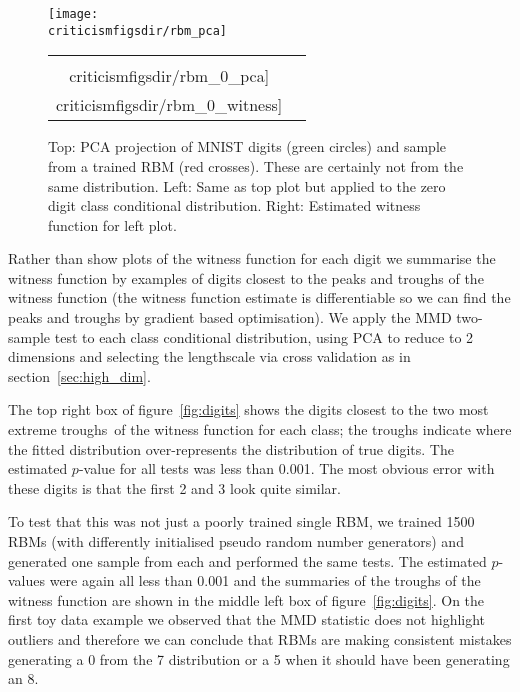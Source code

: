 \begin{figure}[ht]
  \begin{center}
  \texttt{[image: \\criticismfigsdir/rbm\_pca]}
  \end{center}
  \begin{center}
  \begin{tabular}{cc}
    \texttt{[image: \\criticismfigsdir/rbm\_0\_pca]} & 
    \texttt{[image: \\criticismfigsdir/rbm\_0\_witness]}
  \end{tabular}
  \end{center}
  \caption{Top: PCA projection of MNIST digits (green circles) and sample from a trained RBM (red crosses). These are certainly not from the same distribution. Left: Same as top plot but applied to the zero digit class conditional distribution. Right: Estimated witness function for left plot.}
  \label{fig:criticism:rbm_pca}
\end{figure}

Rather than show plots of the witness function for each digit we summarise the witness function by examples of digits closest to the peaks and troughs of the witness function (the witness function estimate is differentiable so we can find the peaks and troughs by gradient based optimisation).
We apply the MMD two-sample test to each class conditional distribution, using PCA to reduce to 2 dimensions and selecting the lengthscale via cross validation as in section~\ref{sec:high_dim}.

The top right box of figure~\ref{fig:digits} shows the digits closest to the two most extreme troughs\footnotemark~of the witness function for each class; the troughs indicate where the fitted distribution over-represents the distribution of true digits.
The estimated $p$-value for all tests was less than 0.001.
The most obvious error with these digits is that the first 2 and 3 look quite similar.

To test that this was not just a poorly trained single RBM, we trained 1500 RBMs (with differently initialised pseudo random number generators) and generated one sample from each and performed the same tests.
The estimated $p$-values were again all less than 0.001 and the summaries of the troughs of the witness function are shown in the middle left box of figure~\ref{fig:digits}.
On the first toy data example we observed that the MMD statistic does not highlight outliers and therefore we can conclude that RBMs are making consistent mistakes \eg generating a 0 from the 7 distribution or a 5 when it should have been generating an 8.

